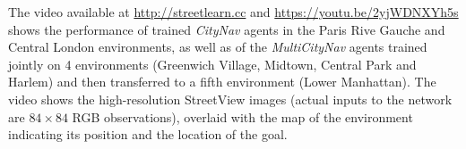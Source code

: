 The video available at \url{http://streetlearn.cc} and \url{https://youtu.be/2yjWDNXYh5s} shows the performance of trained \emph{CityNav} agents in the Paris Rive Gauche and Central London environments, as well as of the \emph{MultiCityNav} agents trained jointly on 4 environments (Greenwich Village, Midtown, Central Park and Harlem) and then transferred to a fifth environment (Lower Manhattan). The video shows the high-resolution StreetView images (actual inputs to the network are $84\times84$ RGB observations), overlaid with the map of the environment indicating its position and the location of the goal.
